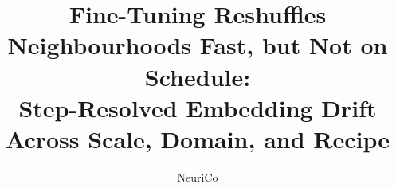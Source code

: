 \documentclass{article}
\title{Fine-Tuning Reshuffles Neighbourhoods Fast, but Not on Schedule:\\
Step-Resolved Embedding Drift Across Scale, Domain, and Recipe}
\author{NeuriCo}
\begin{document}
\maketitle

\begin{abstract}

\end{abstract}










\newpage
\appendix

\end{document}
